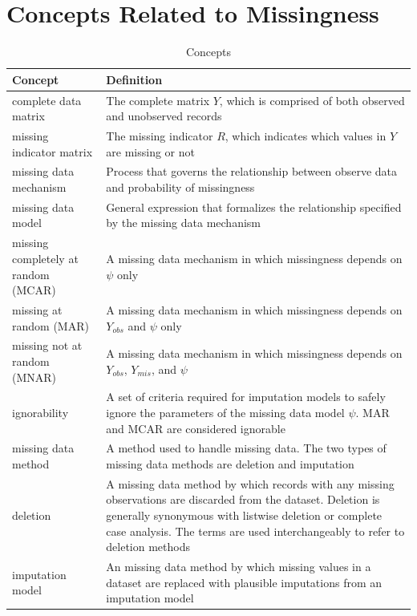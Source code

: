 \documentclass[12pt,oneside]{chicagocapstone}
\begin{document}
\chapter{Concepts Related to
Missingness}\label{concepts-related-to-missingness}
\begin{table}[!h]

\caption{\label{tab:appendixdconcepts}Concepts}
\begin{tabu} to 
\toprule
\begingroup\fontsize{13}{15}\selectfont \textbf{Concept}\endgroup & \begingroup\fontsize{13}{15}\selectfont \textbf{Definition}\endgroup\\
\midrule
complete data matrix & The complete matrix $Y$, which is comprised of both observed and unobserved records\\
missing indicator matrix & The missing indicator $R$, which indicates which values in $Y$ are missing or not\\
missing data mechanism & Process that governs the relationship between observe data and probability of missingness\\
missing data model & General expression that formalizes the relationship specified by the missing data mechanism\\
missing completely at random (MCAR) & A missing data mechanism in which missingness depends on $\psi$ only\\
\addlinespace
missing at random (MAR) & A missing data mechanism in which missingness depends on $Y_{obs}$ and $\psi$ only\\
missing not at random (MNAR) & A missing data mechanism in which missingness depends on $Y_{obs}$, $Y_{mis}$, and $\psi$\\
ignorability & A set of criteria required for imputation models to safely ignore the parameters of the missing data model $\psi$. MAR and MCAR are considered ignorable\\
missing data method & A method used to handle missing data. The two types of missing data methods are deletion and imputation\\
deletion & A missing data method by which records with any missing observations are discarded from the dataset. Deletion is generally synonymous with listwise deletion or complete case analysis. The terms are used interchangeably to refer to deletion methods\\
\addlinespace
imputation model & An missing data method by which missing values in a dataset are replaced with plausible imputations from an imputation model\\
\bottomrule
\end{tabu}
\end{table}
\end{document}
